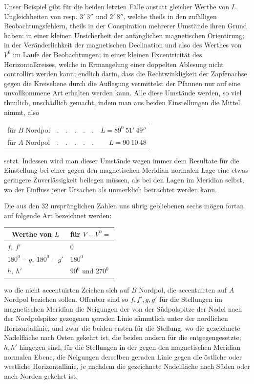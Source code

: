 Unser Beispiel gibt für die beiden letzten Fälle anstatt gleicher Werthe von $L$ Ungleichheiten von resp. $3'\ 3''$ und $2'\ 8''$, welche theils in den zufälligen Beobachtungsfehlern, theils in der Conspiration mehrerer Umstände ihren Grund haben: in einer kleinen Unsicherheit der anfänglichen magnetischen Orientirung; in der Veränderlichkeit der magnetischen Declination und also des Werthes von $V^0$ im Laufe der Beobachtungen; in einer kleinen Excentricität des Horizontalkreises, welche in Ermangelung einer doppelten Ablesung nicht controllirt werden kann; endlich darin, dass die Rechtwinkligkeit der Zapfenachse gegen die Kreisebene durch die Auflegung vermittelst der Pfannen nur auf eine unvollkommene Art erhalten werden kann. Alle diese Umstände werden, so viel thunlich, unschädlich gemacht, indem man aus beiden Einstellungen die Mittel nimmt, also

\par\clearpage
{}
\begin{center}
\begin{tabular}{llr}
für $B$ Nordpol&$.\quad.\quad.\quad.\quad.$&$L=89^0\ 51'\ 49''$\\
für $A$ Nordpol&$.\quad.\quad.\quad.\quad.$&$L=90\ 10\ 48$
\end{tabular}
\end{center}
setzt. Indessen wird man dieser Umstände wegen immer dem Resultate für die Einstellung bei einer gegen den magnetischen Meridian normalen Lage eine etwas geringere Zuverlässigkeit beilegen müssen, als bei den Lagen im Meridian selbst, wo der Einfluss jener Ursachen als unmerklich betrachtet werden kann.

Die aus den $32$ ursprünglichen Zahlen uns übrig gebliebenen sechs mögen fortan auf folgende Art bezeichnet werden:
\begin{center}
\begin{tabular}{l|l}
\multicolumn{1}{c|}{Werthe von $L$}&\multicolumn{1}{c}{für $V-V^0=$}\\\hline
$f,\ f'$&$0$\\
$180^0-g,\ 180^0-g'$&$180^0$\\
$h,\ h'$&$90^0$ und $270^0$
\end{tabular}
\end{center}
wo die nicht accentuirten Zeichen sich auf $B$ Nordpol, die accentuirten auf $A$ Nordpol beziehen sollen. Offenbar sind so $f,f',g,g'$ für die Stellungen im magnetischen Meridian die Neigungen der von der Südpolspitze der Nadel nach der Nordpolspitze gezogenen geraden Linie sämmtlich unter der nordlichen Horizontallinie, und zwar die beiden ersten für die Stellung, wo die gezeichnete Nadelfläche nach Osten gekehrt ist, die beiden andern für die entgegengesetzte; $h,h'$ hingegen sind, für die Stellungen in der gegen den magnetischen Meridian normalen Ebene, die Neigungen derselben geraden Linie gegen die östliche oder westliche Horizontallinie, je nachdem die gezeichnete Nadelfläche nach Süden oder nach Norden gekehrt ist.

